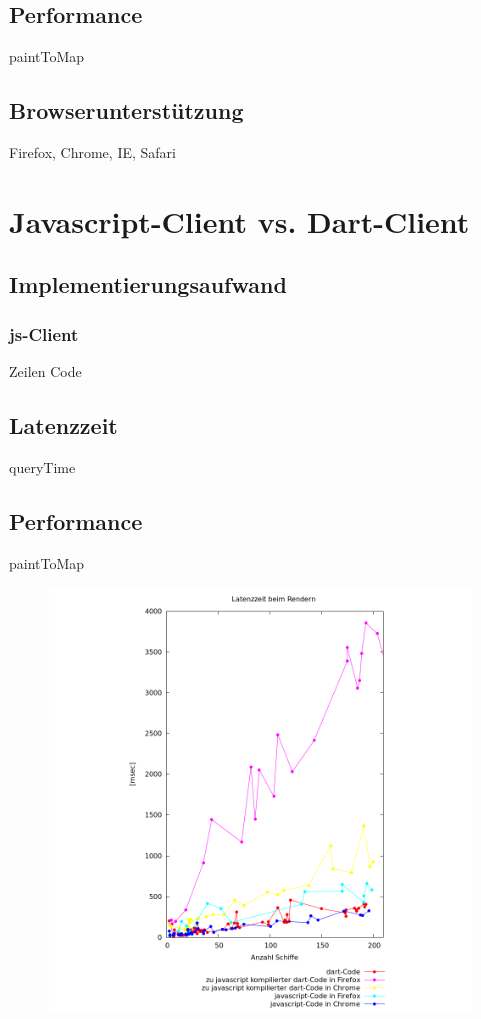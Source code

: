 \subsection{Performance}
paintToMap

\subsection{Browserunterstützung}
Firefox, Chrome, IE, Safari


\section{Javascript-Client vs. Dart-Client} 
\subsection{Implementierungsaufwand}

\subsubsection{js-Client}
Zeilen Code



\subsection{Latenzzeit}
queryTime

\subsection{Performance}
paintToMap


\begin {figure}[H]
\begin{center}
  \includegraphics[width=8in]{images/rendering_all_5_April.png}
\end{center}
\end {figure}


